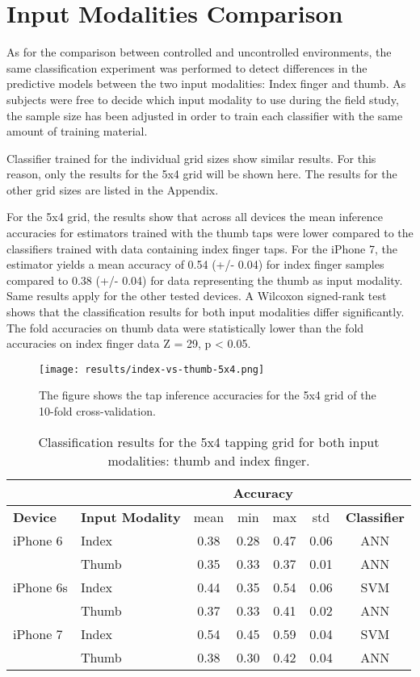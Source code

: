 \section{Input Modalities Comparison}
As for the comparison between controlled and uncontrolled environments, the same classification experiment was performed to detect differences in the predictive models between the two input modalities: Index finger and thumb. As subjects were free to decide which input modality to use during the field study, the sample size has been adjusted in order to train each classifier with the same amount of training material.

Classifier trained for the individual grid sizes show similar results. For this reason, only the results for the 5x4 grid will be shown here. The results for the other grid sizes are listed in the Appendix. %

For the 5x4 grid, the results show that across all devices the mean inference accuracies for estimators trained with the thumb taps were lower compared to the classifiers trained with data containing index finger taps. For the iPhone 7, the estimator yields a mean accuracy of 0.54 (+/- 0.04) for index finger samples compared to 0.38 (+/- 0.04)  for data representing the thumb as input modality.  Same results apply for the other tested devices. A Wilcoxon signed-rank test shows that the classification results for both input modalities differ significantly. The fold accuracies on thumb data were statistically lower than the fold accuracies on index finger data Z = 29, p < 0.05.


\begin{figure}[h!]
  \centering
  \texttt{[image: results/index-vs-thumb-5x4.png]}
  \caption{The figure shows the tap inference accuracies for the 5x4 grid of the 10-fold cross-validation.} \label{fig:participation}
\end{figure}

\begin{table}[h!]
  \centering
\begin{tabular}{|l|l|c|c|c|c|c|}
  \cline{3-6}
  \multicolumn{2}{c}{} & \multicolumn{4}{|c|}{\textbf{Accuracy}}  \\
  \hline
  \textbf{Device} & \textbf{Input Modality} & mean &   min &   max  & std &  \textbf{Classifier} \\
  \hline
  iPhone 6 & Index &      0.38 &     0.28 &     0.47 &     0.06 &  ANN \\
  & Thumb &      0.35 &     0.33 &     0.37 &     0.01 &  ANN \\
  \hline
iPhone 6s & Index &      0.44 &     0.35 &     0.54 &     0.06 &  SVM \\
  & Thumb &      0.37 &     0.33 &     0.41 &     0.02 &  ANN \\
  \hline
  iPhone 7 & Index &      0.54 &     0.45 &     0.59 &     0.04 &  SVM \\
  & Thumb &      0.38 &     0.30 &     0.42 &     0.04 &  ANN \\
  \hline
\end{tabular}
  \caption{Classification results for the 5x4 tapping grid for both input modalities: thumb and index finger.}
\end{table}

